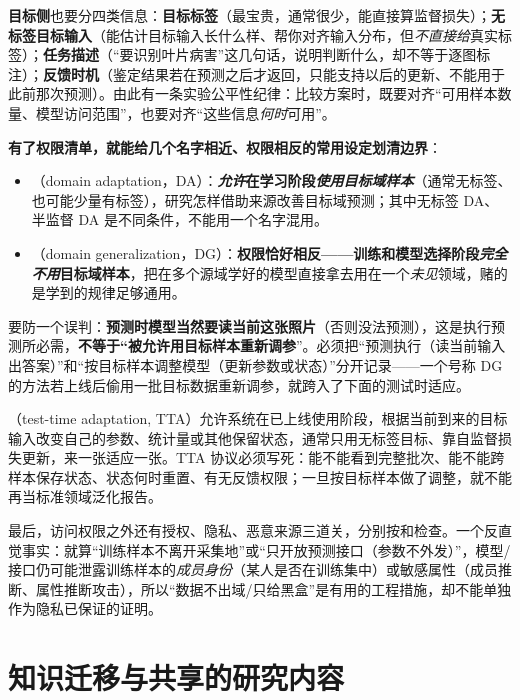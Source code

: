 \textbf{目标侧}也要分四类信息：\textbf{目标标签}（最宝贵，通常很少，能直接算监督损失）；\textbf{无标签目标输入}（能估计目标输入长什么样、帮你对齐输入分布，但\emph{不直接给}真实标签）；\textbf{任务描述}（“要识别叶片病害”这几句话，说明判断什么，却不等于逐图标注）；\textbf{反馈时机}（鉴定结果若在预测之后才返回，只能支持以后的更新、不能用于此前那次预测）。由此有一条实验公平性纪律：比较方案时，既要对齐“可用样本数量、模型访问范围”，也要对齐“这些信息\emph{何时}可用”。

\textbf{有了权限清单，就能给几个名字相近、权限相反的常用设定划清边界}：
\begin{itemize}\item {}（domain adaptation，DA）：\textbf{\emph{允许}在学习阶段\emph{使用目标域样本}}（通常无标签、也可能少量有标签），研究怎样借助来源改善目标域预测；其中无标签 DA、半监督 DA 是不同条件，不能用一个名字混用。\item {}（domain generalization，DG）：\textbf{权限恰好相反——训练和模型选择阶段\emph{完全不用}目标域样本}，把在多个源域学好的模型直接拿去用在一个\emph{未见}领域，赌的是学到的规律足够通用。\end{itemize}
要防一个误判：\textbf{预测时模型当然要读当前这张照片}（否则没法预测），这是执行预测所必需，\textbf{不等于“被允许用目标样本重新调参}”。必须把“预测执行（读当前输入出答案）”和“按目标样本调整模型（更新参数或状态）”分开记录——一个号称 DG 的方法若上线后偷用一批目标数据重新调参，就跨入了下面的测试时适应。

（test-time adaptation, TTA）允许系统在已上线使用阶段，根据当前到来的目标输入改变自己的参数、统计量或其他保留状态，通常只用无标签目标、靠自监督损失更新，来一张适应一张。TTA 协议必须写死：能不能看到完整批次、能不能跨样本保存状态、状态何时重置、有无反馈权限；一旦按目标样本做了调整，就不能再当标准领域泛化报告。

最后，访问权限之外还有授权、隐私、恶意来源三道关，分别按和检查。一个反直觉事实：就算“训练样本不离开采集地”或“只开放预测接口（参数不外发）”，模型/接口仍可能泄露训练样本的\emph{成员身份}（某人是否在训练集中）或敏感属性（成员推断、属性推断攻击），所以“数据不出域/只给黑盒”是有用的工程措施，却不能单独作为隐私已保证的证明。

\section{知识迁移与共享的研究内容}
\label{sec:kts-overview-research}

